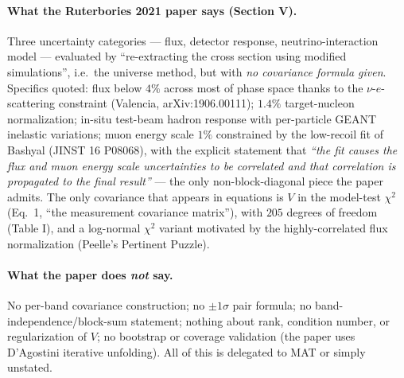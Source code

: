 \paragraph{What the Ruterbories 2021 paper says (Section V).}
Three uncertainty categories --- flux, detector response,
neutrino-interaction model --- evaluated by ``re-extracting the cross
section using modified simulations'', i.e.\ the universe method, but
with \emph{no covariance formula given}. Specifics quoted:
flux below $4\%$ across most of phase space thanks to the
$\nu$-$e$-scattering constraint (Valencia, arXiv:1906.00111);
$1.4\%$ target-nucleon normalization; in-situ test-beam hadron
response with per-particle GEANT inelastic variations; muon energy
scale $1\%$ constrained by the low-recoil fit of Bashyal
(JINST 16 P08068), with the explicit statement that
\emph{``the fit causes the flux and muon energy scale uncertainties to
be correlated and that correlation is propagated to the final
result''} --- the only non-block-diagonal piece the paper admits.
The only covariance that appears in equations is $V$ in the model-test
$\chi^{2}$ (Eq.~1, ``the measurement covariance matrix''), with $205$
degrees of freedom (Table I), and a log-normal $\chi^{2}$ variant
motivated by the highly-correlated flux normalization (Peelle's
Pertinent Puzzle).

\paragraph{What the paper does \emph{not} say.}
No per-band covariance construction; no $\pm1\sigma$ pair formula; no
band-independence/block-sum statement; nothing about rank, condition
number, or regularization of $V$; no bootstrap or coverage validation
(the paper uses D'Agostini iterative unfolding). All of this is
delegated to MAT or simply unstated.

